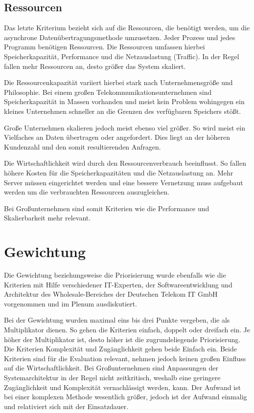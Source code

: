 \subsection{Ressourcen}
Das letzte Kriterium bezieht sich auf die Ressourcen, die benötigt werden, um die asynchrone Datenübertragungsmethode umzusetzen. Jeder Prozess und jedes Programm benötigen Ressourcen. Die Ressourcen umfassen hierbei Speicherkapazität, Performance und die Netzauslastung (Traffic). In der Regel fallen mehr Ressourcen an, desto größer das System skaliert. 

Die Ressourcenkapazität variiert hierbei stark nach Unternehmensgröße und Philosophie. Bei einem großen Telekommunikationsunternehmen sind Speicherkapazität in Massen vorhanden und meist kein Problem wohingegen ein kleines Unternehmen schneller an die Grenzen des verfügbaren Speichers stößt. 

Große Unternehmen skalieren jedoch meist ebenso viel größer. So wird meist ein Vielfaches an Daten übertragen oder angefordert. Dies liegt an der höheren Kundenzahl und den somit resultierenden Anfragen.

Die Wirtschaftlichkeit wird durch den Ressourcenverbrauch beeinflusst. So fallen höhere Kosten für die Speicherkapazitäten und die Netzauslastung an. Mehr Server müssen eingerichtet werden und eine bessere Vernetzung muss aufgebaut werden um die verbrauchten Ressourcen auszugleichen.

Bei Großunternehmen sind somit Kriterien wie die Performance und Skalierbarkeit mehr relevant.

\section{Gewichtung}
Die Gewichtung beziehungsweise die Priorisierung wurde ebenfalls wie die Kriterien mit Hilfe verschiedener IT-Experten, der Softwareentwicklung und Architektur des Wholesale-Bereiches der Deutschen Telekom IT GmbH vorgenommen und im Plenum ausdiskutiert. 

Bei der Gewichtung wurden maximal eins bis drei Punkte vergeben, die als Multiplikator dienen. So gehen die Kriterien einfach, doppelt oder dreifach ein. Je höher der Multiplikator ist, desto höher ist die zugrundeliegende Priorisierung. \\

Die Kriterien Komplexität und Zugänglichkeit gehen beide Einfach ein. Beide Kriterien sind für die Evaluation relevant, nehmen jedoch keinen großen Einfluss auf die Wirtschaftlichkeit. Bei Großunternehmen sind Anpassungen der Systemarchitektur in der Regel nicht zeitkritisch, weshalb eine geringere Zugänglichkeit und Komplexität vernachlässigt werden, kann. Der Aufwand ist bei einer komplexen Methode wesentlich größer, jedoch ist der Aufwand einmalig und relativiert sich mit der Einsatzdauer. 

